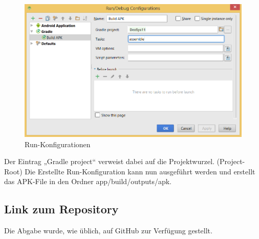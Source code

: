 \begin{figure}[H]
	\begin{center}
		\includegraphics[width=1.0\linewidth]{images/run.png}
		\caption{Run-Konfigurationen}
		\label{Run-Konfigurationen}
	\end{center}
\end{figure}

Der Eintrag „Gradle project“ verweist dabei auf die Projektwurzel. (Project-Root)
Die Erstellte Run-Konfiguration kann nun ausgeführt werden und erstellt das APK-File in den Ordner app/build/outputs/apk.

\subsection{Link zum Repository}
\label{subsec:Link zum Repository}
Die Abgabe wurde, wie üblich, auf GitHub zur Verfügung gestellt. \cite{GitHub-Repo}


\newpage